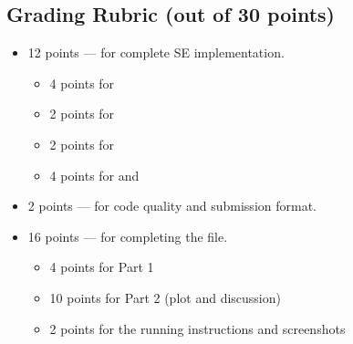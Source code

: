 

\subsection{Grading Rubric (out of 30 points)}

\begin{itemize}
\item 12 points — for complete SE implementation.
    \begin{itemize}
        \item 4 points for 
        \item 2 points for 
        \item 2 points for 
        \item 4 points for  and 
    \end{itemize}
\item 2 points — for code quality and submission format.
\item 16 points — for completing the  file.
    \begin{itemize}
        \item 4 points for Part 1 
        \item 10 points for Part 2 (plot and discussion)
        \item 2 points for the running instructions and screenshots
    \end{itemize}
\end{itemize}



